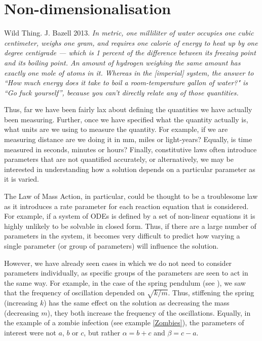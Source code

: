 \chapter{Non-dimensionalisation}\label{Non-dimensionalisation}
\begin{aquote}{Wild Thing. J. Bazell 2013.}
\textit{In metric, one milliliter of water occupies one cubic centimeter, weighs one gram, and requires one calorie of energy to heat up by one degree centigrade — which is 1 percent of the difference between its freezing point and its boiling point. An amount of hydrogen weighing the same amount has exactly one mole of atoms in it. Whereas in the [imperial] system, the answer to ``How much energy does it take to boil a room-temperature gallon of water?" is ``Go fuck yourself'', because you can't directly relate any of those quantities.}
\end{aquote}

Thus, far we have been fairly lax about defining the quantities we have actually been measuring. Further, once we have specified what the quantity actually is, what units are we using to measure the quantity. For example, if we are measuring distance are we doing it in mm, miles or light-years? Equally, is time measured in seconds, minutes or hours? Finally, constitutive laws often introduce parameters that are not quantified accurately, or alternatively, we may be interested in understanding how a solution depends on a particular parameter as it is varied. 

The Law of Mass Action, in particular, could be thought to be a troublesome law as it introduces a rate parameter for each reaction equation that is considered. For example, if a system of ODEs is defined by a set of non-linear equations it is highly unlikely to be solvable in closed form. Thus, if there are a large number of parameters in the system, it becomes very difficult to predict how varying a single parameter (or group of parameters) will influence the solution.

However, we have already seen cases in which we do not need to consider parameters individually, as specific groups of the parameters are seen to act in the same way. For example, in the case of the spring pendulum (see ), we saw that the frequency of oscillation depended on $\sqrt{k/m}$. Thus, stiffening the spring (increasing $k$) has the same effect on the solution as decreasing the mass (decreasing $m$), \ie they both increase the frequency of the oscillations. Equally, in the example of a zombie infection (see example \ref{Zombies}), the parameters of interest were not $a$, $b$ or $c$, but rather $\alpha=b+c$ and $\beta=c-a$.

